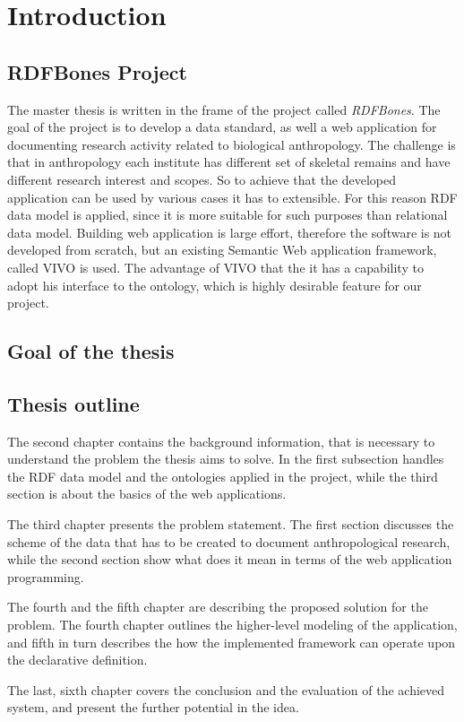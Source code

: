 \chapter{Introduction}


\section{RDFBones Project}

The master thesis is written in the frame of the project called \textit{RDFBones}. The goal of the project is to develop a data standard, as well a web application for documenting research activity related to biological anthropology. The challenge is that in anthropology each institute has different set of skeletal remains and have different research interest and scopes. So to achieve that the developed application can be used by various cases it has to extensible. For this reason RDF data model is applied, since it is more suitable for such purposes than relational data model.\cite{infrastructure}
Building web application is large effort, therefore the software is not developed from scratch, but an existing Semantic Web application framework, called VIVO is used. The advantage of VIVO that the it has a capability to adopt his interface to the ontology, which is highly desirable feature for our project. 


\section{Goal of the thesis}





\section{Thesis outline}

The second chapter contains the background information, that is necessary to understand the problem the thesis aims to solve. In the first subsection handles the RDF data model and the ontologies applied in the project, while the third section is about the basics of the web applications.

The third chapter presents the problem statement. The first section discusses the scheme of the data that has to be created to document anthropological research, while the second section show what does it mean in terms of the web application programming. 

The fourth and the fifth chapter are describing the proposed solution for the problem. The fourth chapter outlines the higher-level modeling of the application, and fifth in turn describes the how the implemented framework can operate upon the declarative definition.

The last, sixth chapter covers the conclusion and the evaluation of the achieved system, and present the further potential in the idea.  



